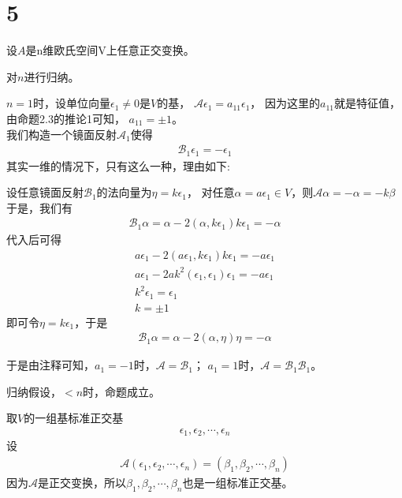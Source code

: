 \documentclass{article}
\begin{document}
\section*{5}

设$A$是n维欧氏空间V上任意正交变换。

对$n$进行归纳。

$n = 1$时，设单位向量$\epsilon_1 \neq 0$是$V$的基，
$\mathscr{A} \epsilon_1 = a_{11}\epsilon_1$，
因为这里的$a_{11}$就是特征值，由命题2.3的推论1可知，
$a_{11} = \pm 1$。\\
我们构造一个镜面反射$\mathscr{A}_1$使得
\begin{align*}
  \mathscr{B}_1 \epsilon_1 = -\epsilon_1
\end{align*}
其实一维的情况下，只有这么一种，理由如下:
\begin{zremark}
  设任意镜面反射$\mathscr{B}_1$的法向量为$\eta = k \epsilon_1$，
  对任意$\alpha = a \epsilon_1 \in V$，则$\mathscr{A} \alpha = -\alpha = -k \beta$
  于是，我们有
  \begin{align*}
    \mathscr{B}_1 \alpha = \alpha - 2(\alpha, k \epsilon_1) k \epsilon_1 = - \alpha
  \end{align*}
  代入后可得
  \begin{align*}
    a \epsilon_1 - 2 (a \epsilon_1, k \epsilon_1) k \epsilon_1 = - a \epsilon_1 \\
    a \epsilon_1 - 2 a k^2 (\epsilon_1, \epsilon_1) \epsilon_1 = - a \epsilon_1 \\
    k^2 \epsilon_1 = \epsilon_1                                                 \\
    k = \pm 1
  \end{align*}
  即可令$\eta = k \epsilon_1$，于是
  \begin{align*}
    \mathscr{B}_1 \alpha = \alpha - 2(\alpha, \eta) \eta = - \alpha
  \end{align*}
\end{zremark}
于是由注释可知，$a_1 = -1$时，$\mathscr{A} = \mathscr{B}_1$；
$a_1 = 1$时，$\mathscr{A} = \mathscr{B}_1 \mathscr{B}_1$。

归纳假设，$< n$时，命题成立。

取$V$的一组基标准正交基
\begin{align*}
  \epsilon_1, \epsilon_2, \cdots, \epsilon_n
\end{align*}
设
\begin{align*}
  \mathscr{A}(\epsilon_1, \epsilon_2, \cdots, \epsilon_n)
  = (\beta_1, \beta_2, \cdots, \beta_n)
\end{align*}
因为$\mathscr{A}$是正交变换，所以$\beta_1, \beta_2, \cdots, \beta_n$也是一组标准正交基。
\end{document}

